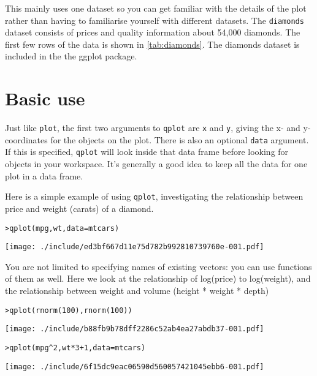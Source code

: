 This mainly uses one dataset so you can get familiar with the details of the plot rather than having to familiarise yourself with different datasets.  The {\tt diamonds} dataset consists of prices and quality information about 54,000 diamonds.  The first few rows of the data is  shown in \ref{tab:diamonds}.  The diamonds dataset is included in the the ggplot package.


\section{Basic use}\label{sec:basic_use}

Just like {\tt plot}, the first two arguments to {\tt qplot} are {\tt x} and {\tt y}, giving the x- and y-coordinates for the objects on the plot. There is also an optional {\tt data} argument.  If this is specified, {\tt qplot} will look inside that data frame before looking for objects in your workspace.  It's generally a good idea to keep all the data for one plot in a data frame.  

Here is a simple example of using {\tt qplot}, investigating the relationship between price and weight (carats) of a diamond.  

\begin{alltt}
> qplot(mpg, wt, data = mtcars)
\end{alltt}
\texttt{[image: ./include/ed3bf667d11e75d782b992810739760e-001.pdf]}
\begin{alltt}

\end{alltt}

You are not limited to specifying names of existing vectors: you can use functions of them as well.  Here we look at the relationship of log(price) to log(weight), and the relationship between weight and volume (height * weight * depth)

\begin{alltt}
> qplot(rnorm(100), rnorm(100))
\end{alltt}
\texttt{[image: ./include/b88fb9b78dff2286c52ab4ea27abdb37-001.pdf]}
\begin{alltt}

> qplot(mpg^2, wt * 3 + 1, data = mtcars)
\end{alltt}
\texttt{[image: ./include/6f15dc9eac06590d560057421045ebb6-001.pdf]}
\begin{alltt}

\end{alltt}

